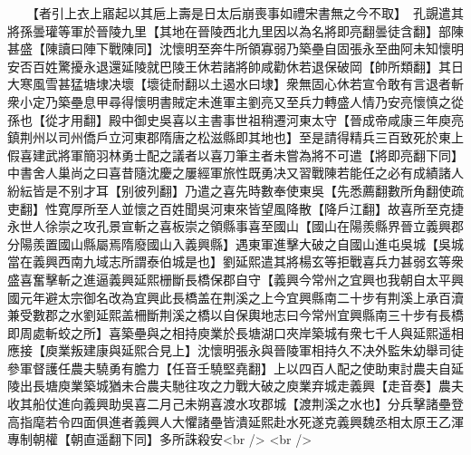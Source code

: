 　　【者引上衣上寤起以其巵上壽是日太后崩喪事如禮宋書無之今不取】　孔覬遣其將孫曇瓘等軍於晉陵九里【其地在晉陵西北九里因以為名將即亮翻曇徒含翻】部陳甚盛【陳讀曰陣下戰陳同】沈懷明至奔牛所領寡弱乃築壘自固張永至曲阿未知懷明安否百姓驚擾永退還延陵就巴陵王休若諸將帥咸勸休若退保破岡【帥所類翻】其日大寒風雪甚猛塘埭决壞【壞徒耐翻以土遏水曰埭】衆無固心休若宣令敢有言退者斬衆小定乃築壘息甲尋得懷明書賊定未進軍主劉亮又至兵力轉盛人情乃安亮懷慎之從孫也【從才用翻】殿中御史吳喜以主書事世祖稍遷河東太守【晉成帝咸康三年庾亮鎮荆州以司州僑戶立河東郡隋唐之松滋縣即其地也】至是請得精兵三百致死於東上假喜建武將軍簡羽林勇士配之議者以喜刀筆主者未嘗為將不可遣【將即亮翻下同】中書舍人巢尚之曰喜昔隨沈慶之屢經軍旅性既勇决又習戰陳若能任之必有成績諸人紛紜皆是不别才耳【别彼列翻】乃遣之喜先時數奉使東吳【先悉薦翻數所角翻使疏吏翻】性寛厚所至人並懷之百姓聞吳河東來皆望風降散【降戶江翻】故喜所至克捷永世人徐崇之攻孔景宣斬之喜板崇之領縣事喜至國山【國山在陽羨縣界晉立義興郡分陽羨置國山縣屬焉隋廢國山入義興縣】遇東軍進擊大破之自國山進屯吳城【吳城當在義興西南九域志所謂泰伯城是也】劉延熙遣其將楊玄等拒戰喜兵力甚弱玄等衆盛喜奮擊斬之進逼義興延熙栅斷長橋保郡自守【義興今常州之宜興也我朝自太平興國元年避太宗御名改為宜興此長橋盖在荆溪之上今宜興縣南二十步有荆溪上承百瀆兼受數郡之水劉延熙盖柵斷荆溪之橋以自保輿地志曰今常州宜興縣南三十步有長橋即周處斬蛟之所】喜築壘與之相持庾業於長塘湖口夾岸築城有衆七千人與延熙遥相應接【庾業叛建康與延熙合見上】沈懷明張永與晉陵軍相持久不决外監朱幼舉司徒參軍督護任農夫驍勇有膽力【任音壬驍堅堯翻】上以四百人配之使助東討農夫自延陵出長塘庾業築城猶未合農夫馳往攻之力戰大破之庾業弃城走義興【走音奏】農夫收其船仗進向義興助吳喜二月己未朔喜渡水攻郡城【渡荆溪之水也】分兵擊諸壘登高指麾若令四面俱進者義興人大懼諸壘皆潰延熙赴水死遂克義興魏丞相太原王乙渾專制朝權【朝直遥翻下同】多所誅殺安<br />
<br />
